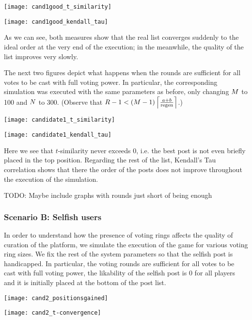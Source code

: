      \texttt{[image: cand1good\_t\_similarity]}

      \texttt{[image: cand1good\_kendall\_tau]}

      As we can see, both measures show that the real list converges suddenly to
      the ideal order at the very end of the execution; in the meanwhile, the
      quality of the list improves very slowly.

      The next two figures depict what happens when the rounds are sufficient
      for all votes to be cast with full voting power. In particular, the
      corresponding simulation was executed with the same parameters as before,
      only changing $\postlen$ to 100 and $\playerlen$ to 300. (Observe that
      $\rounds - 1 < \left(\postlen - 1\right)\ceil*{\frac{a + b}{\regen}}$.)

      \texttt{[image: candidate1\_t\_similarity]}

      \texttt{[image: candidate1\_kendall\_tau]}

      Here we see that $t$-similarity never exceeds 0, i.e. the best post is not
      even briefly placed in the top position. Regarding the rest of the list,
      Kendall's Tau correlation shows that there the order of the posts does not
      improve throughout the execution of the simulation.

      TODO: Maybe include graphs with rounds just short of being enough

    \subsubsection{Scenario B: Selfish users}
      In order to understand how the presence of voting rings affects the
      quality of curation of the platform, we simulate the execution of the game
      for various voting ring sizes. We fix the rest of the system parameters so
      that the selfish post is handicapped. In particular, the voting rounds are
      sufficient for all votes to be cast with full voting power, the likability
      of the selfish post is 0 for all players and it is initially placed at the
      bottom of the post list.

      \texttt{[image: cand2\_positionsgained]}

      \texttt{[image: cand2\_t-convergence]}
